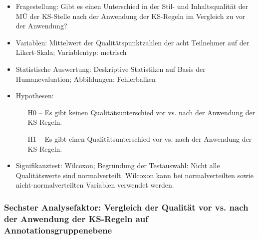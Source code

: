 \begin{itemize}
\item Fragestellung: Gibt es einen Unterschied in der Stil- und Inhaltsqualität der MÜ der KS-Stelle nach der Anwendung der KS-Regeln im Vergleich zu vor der Anwendung?
\item Variablen: Mittelwert der Qualitätspunktzahlen der acht Teilnehmer auf der Likert-Skala; Variablentyp: metrisch
\item Statistische Auswertung: Deskriptive Statistiken auf Basis der Humanevaluation; Abbildungen: Fehlerbalken
\item Hypothesen:

  \begin{itemize}[align=left]
  \item [H0 --] Es gibt keinen Qualitätsunterschied vor vs. nach der Anwendung der KS-Regeln.

  \item [H1 --] Es gibt einen Qualitätsunterschied vor vs. nach der Anwendung der KS-Regeln.
  \end{itemize}

\item Signifikanztest: Wilcoxon; Begründung der Testauswahl: Nicht alle Qualitätswerte sind normalverteilt. Wilcoxon kann bei normalverteilten sowie nicht-normalverteilten Variablen verwendet werden.
\end{itemize}

\subsubsection{Sechster Analysefaktor: Vergleich der Qualität vor vs. nach der Anwendung der KS-Regeln auf Annotationsgruppenebene}

